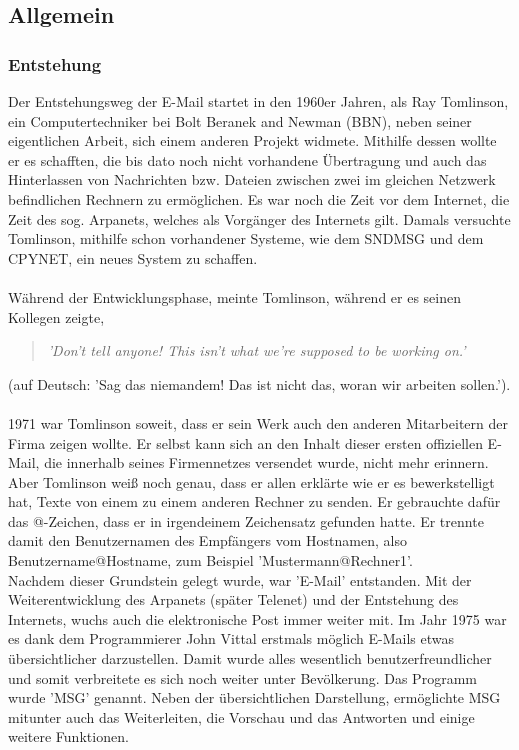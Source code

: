 \documentclass[12pt,a4paper]{report}
\begin{document}
\begin{onehalfspace}
\section{Allgemein}
\subsubsection{Entstehung}\label{sssec:Entstehung}
Der Entstehungsweg der E-Mail startet in den 1960er Jahren, als Ray Tomlinson, ein Computertechniker bei Bolt Beranek and Newman (BBN), neben seiner eigentlichen Arbeit, sich einem anderen Projekt widmete. Mithilfe dessen wollte er es schafften, die bis dato noch nicht vorhandene Übertragung und auch das Hinterlassen von Nachrichten bzw. Dateien zwischen zwei im gleichen Netzwerk befindlichen Rechnern zu ermöglichen. Es war noch die Zeit vor dem Internet, die Zeit des sog. Arpanets, welches als Vorgänger des Internets gilt. Damals versuchte Tomlinson, mithilfe schon vorhandener Systeme, wie dem SNDMSG und dem CPYNET, ein neues System zu schaffen.\\\\

Während der Entwicklungsphase, meinte Tomlinson, während er es seinen Kollegen zeigte, 
\begin{quote}
\textit{'Don't tell anyone! This isn't what we're supposed to be working on.'}
\end{quote}
(auf Deutsch: 'Sag das niemandem! Das ist nicht das, woran wir arbeiten sollen.').\\\\

1971 war Tomlinson soweit, dass er sein Werk auch den anderen Mitarbeitern der Firma zeigen wollte. Er selbst kann sich an den Inhalt dieser ersten offiziellen E-Mail, die innerhalb seines Firmennetzes versendet wurde, nicht mehr erinnern. Aber Tomlinson weiß noch genau, dass er allen erklärte wie er es bewerkstelligt hat, Texte von einem zu einem anderen Rechner zu senden. Er gebrauchte dafür das @-Zeichen, dass er in irgendeinem Zeichensatz gefunden hatte. Er trennte damit den Benutzernamen des Empfängers vom Hostnamen, also Benutzername@Hostname, zum Beispiel 'Mustermann@Rechner1'. \\

Nachdem dieser Grundstein gelegt wurde, war 'E-Mail' entstanden. Mit der Weiterentwicklung des Arpanets (später Telenet) und der Entstehung des Internets, wuchs auch die elektronische Post immer weiter mit. Im Jahr 1975 war es dank dem Programmierer John Vittal erstmals möglich E-Mails etwas übersichtlicher darzustellen. Damit wurde alles wesentlich benutzerfreundlicher und somit verbreitete es sich noch weiter unter Bevölkerung. Das Programm wurde 'MSG' genannt. Neben der übersichtlichen Darstellung, ermöglichte MSG mitunter auch das Weiterleiten, die Vorschau und das Antworten und einige weitere Funktionen.\\


\end{onehalfspace}
\end{document}
